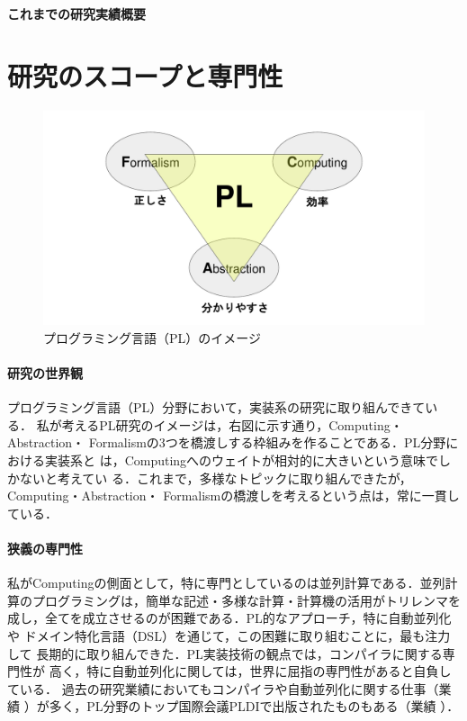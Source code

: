 \documentclass[dvipdfmx]{jsarticle}
\begin{document}
\begin{center}
\LARGE\bfseries これまでの研究実績概要
\end{center}

\section*{研究のスコープと専門性}

\begin{figure}
 \centering
 \includegraphics[width=\linewidth,trim=120 20 120 40]{PL-overview.pdf}
 \caption{プログラミング言語（PL）のイメージ}\label{fig:PL-overview}
\end{figure}
\paragraph{研究の世界観}
プログラミング言語（PL）分野において，実装系の研究に取り組んできている．
私が考えるPL研究のイメージは，右図に示す通り，Computing・Abstraction・
Formalismの3つを橋渡しする枠組みを作ることである．PL分野における実装系と
は，Computingへのウェイトが相対的に大きいという意味でしかないと考えてい
る．これまで，多様なトピックに取り組んできたが，Computing・Abstraction・
Formalismの橋渡しを考えるという点は，常に一貫している．

\paragraph{狭義の専門性}
私がComputingの側面として，特に専門としているのは並列計算である．並列計
算のプログラミングは，簡単な記述・多様な計算・計算機の活用がトリレンマを
成し，全てを成立させるのが困難である．PL的なアプローチ，特に自動並列化や
ドメイン特化言語（DSL）を通じて，この困難に取り組むことに，最も注力して
長期的に取り組んできた．PL実装技術の観点では，コンパイラに関する専門性が
高く，特に自動並列化に関しては，世界に屈指の専門性があると自負している．
過去の研究業績においてもコンパイラや自動並列化に関する仕事（業績
\cite{pldi21:red_par,ipdps21:plex,jip20:centaurus,splash19:nbody,adbis18:par_xpath,jip17:hadoop,aplas14:sd_dfa,pro13:tree_par,pldi11:red_par,aplas09:gpu_skel}
）が多く，PL分野のトップ国際会議PLDIで出版されたものもある（業績
\cite{pldi21:red_par,pldi11:red_par}）．
\end{document}
